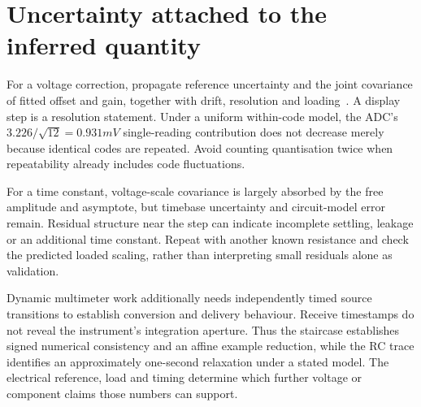 \section{Uncertainty attached to the inferred quantity}
For a voltage correction, propagate reference uncertainty and the joint covariance of fitted offset and gain, together with drift, resolution and loading~\cite{gum}. A display step is a resolution statement. Under a uniform within-code model, the ADC's $3.226/\sqrt{12}=0.931\unit{mV}$ single-reading contribution does not decrease merely because identical codes are repeated. Avoid counting quantisation twice when repeatability already includes code fluctuations.

For a time constant, voltage-scale covariance is largely absorbed by the free amplitude and asymptote, but timebase uncertainty and circuit-model error remain. Residual structure near the step can indicate incomplete settling, leakage or an additional time constant. Repeat with another known resistance and check the predicted loaded scaling, rather than interpreting small residuals alone as validation.

Dynamic multimeter work additionally needs independently timed source transitions to establish conversion and delivery behaviour. Receive timestamps do not reveal the instrument's integration aperture. Thus the staircase establishes signed numerical consistency and an affine example reduction, while the RC trace identifies an approximately one-second relaxation under a stated model. The electrical reference, load and timing determine which further voltage or component claims those numbers can support.
